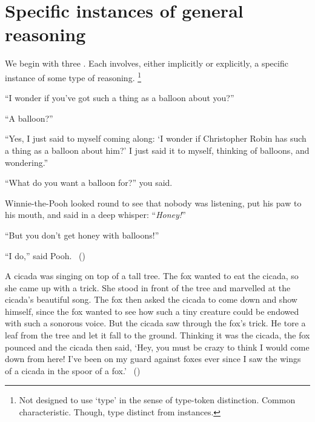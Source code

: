 \newpage

\section{Specific instances of general reasoning}
\label{cha:typical:sec:g-s}

\begin{note}
  We begin with three .
  Each  involves, either implicitly or explicitly, a specific instance of some type of reasoning.%
  \footnote{
    Not designed to use `type' in the sense of type-token distinction.
    Common characteristic.
    Though, type distinct from instances.
  }
\end{note}

\begin{note}
  \begin{scenario}
    ``I wonder if you've got such a thing as a balloon about you?''

    \noindent%
    ``A balloon?''

    \noindent%
    ``Yes, I just said to myself coming along:
    `I wonder if Christopher Robin has such a thing as a balloon about him?'
    I just said it to myself, thinking of balloons, and wondering.''

    \noindent%
    ``What do you want a balloon for?'' you said.

    \noindent%
    Winnie-the-Pooh looked round to see that nobody was listening, put his paw to his mouth, and said in a deep whisper:
    ``\emph{Honey!}''

    \noindent%
    ``But you don't get honey with balloons!''

    \noindent%
    ``I do,'' said Pooh.%
    \mbox{ }\hfill\mbox{(\cite[12]{Milne:2009aa})}\newline
    \mbox{ }
  \end{scenario}

  \begin{scenario}
    A cicada was singing on top of a tall tree.
    The fox wanted to eat the cicada, so she came up with a trick.
    She stood in front of the tree and marvelled at the cicada's beautiful song.
    The fox then asked the cicada to come down and show himself, since the fox wanted to see how such a tiny creature could be endowed with such a sonorous voice.
    But the cicada saw through the fox's trick.
    He tore a leaf from the tree and let it fall to the ground.
    Thinking it was the cicada, the fox pounced and the cicada then said,
    `Hey, you must be crazy to think I would come down from here! I've been on my guard against foxes ever since I saw the wings of a cicada in the spoor of a fox.'%
    \mbox{ }\hfill\mbox{(\cite[136]{Aesop:2002aa})}\newline
    \mbox{ }
  \end{scenario}


\end{note}
